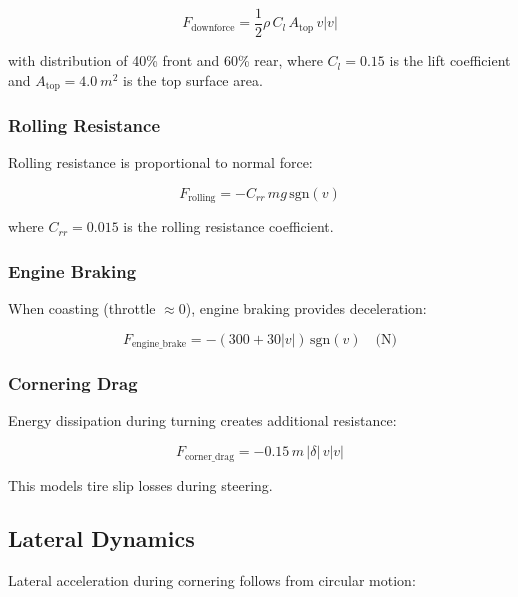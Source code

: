 \documentclass[11pt,a4paper]{article}
\begin{document}
\begin{equation}
F_{\text{downforce}} = \frac{1}{2} \rho \, C_l \, A_{\text{top}} \, v |v|
\end{equation}

with distribution of 40\% front and 60\% rear, where $C_l = 0.15$ is the lift coefficient and $A_{\text{top}} = \SI{4.0}{m^2}$ is the top surface area.

\subsubsection{Rolling Resistance}

Rolling resistance is proportional to normal force:

\begin{equation}
F_{\text{rolling}} = -C_{rr} \, m g \, \text{sgn}(v)
\end{equation}

where $C_{rr} = 0.015$ is the rolling resistance coefficient.

\subsubsection{Engine Braking}

When coasting (throttle $\approx 0$), engine braking provides deceleration:

\begin{equation}
F_{\text{engine\_brake}} = -(300 + 30|v|) \, \text{sgn}(v) \quad \text{(N)}
\end{equation}

\subsubsection{Cornering Drag}

Energy dissipation during turning creates additional resistance:

\begin{equation}
F_{\text{corner\_drag}} = -0.15 \, m \, |\delta| \, v |v|
\end{equation}

This models tire slip losses during steering.

\subsection{Lateral Dynamics}

Lateral acceleration during cornering follows from circular motion:
\end{document}
